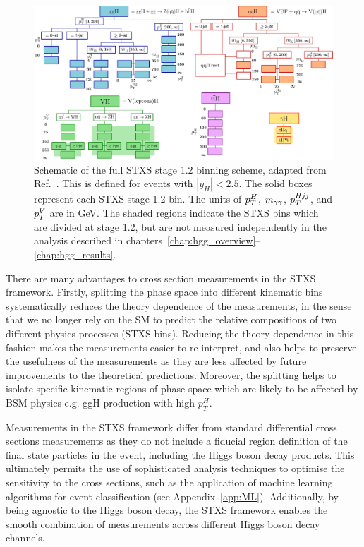 \begin{figure}[htb!]
  \centering
  \includegraphics[width=1\linewidth]{Figures/theory/allSTXSbins.pdf}
  \caption[STXS stage 1.2 binning scheme]
  {
    Schematic of the full STXS stage 1.2 binning scheme, adapted from Ref.~\cite{deFlorian:2016spz}. This is defined for events with $|y_H|<2.5$. The solid boxes represent each STXS stage 1.2 bin. The units of $p_T^H$, $m_{\gamma\gamma}$, $p_T^{Hjj}$, and $p_T^V$ are in GeV. The shaded regions indicate the STXS bins which are divided at stage 1.2, but are not measured independently in the \Hgg analysis described in chapters~\ref{chap:hgg_overview}--\ref{chap:hgg_results}.
  }
  \label{fig:stxs_schematic}
\end{figure}

There are many advantages to cross section measurements in the STXS framework. Firstly, splitting the phase space into different kinematic bins systematically reduces the theory dependence of the measurements, in the sense that we no longer rely on the SM to predict the relative compositions of two different physics processes (STXS bins). Reducing the theory dependence in this fashion makes the measurements easier to re-interpret, and also helps to preserve the usefulness of the measurements as they are less affected by future improvements to the theoretical predictions. Moreover, the splitting helps to isolate specific kinematic regions of phase space which are likely to be affected by BSM physics e.g. ggH production with high $p_T^H$. 

Measurements in the STXS framework differ from standard differential cross sections measurements as they do not include a fiducial region definition of the final state particles in the event, including the Higgs boson decay products. This ultimately permits the use of sophisticated analysis techniques to optimise the sensitivity to the cross sections, such as the application of machine learning algorithms for event classification (see Appendix~\ref{app:ML}). Additionally, by being agnostic to the Higgs boson decay, the STXS framework enables the smooth combination of measurements across different Higgs boson decay channels. 

